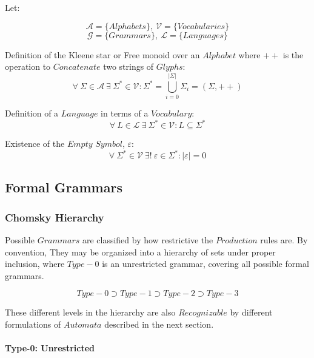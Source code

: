 \documentclass{article}
\begin{document}
Let:

\[
    \mathcal{A} = \{ Alphabets \},\: \mathcal{V} = \{ Vocabularies \}
\] \[
    \mathcal{G} = \{ Grammars \},\: \mathcal{L} = \{ Languages \}
\]

    \begin{description}

    \item Definition of the Kleene star or Free monoid over an
      $Alphabet$ where $++$ is the operation to $Concatenate$ two
      strings of $Glyphs$:
    \[
        \forall \: \Sigma \in \mathcal{A} \:
        \exists \: \Sigma^* \in \mathcal{V}
        : \Sigma^* = \bigcup_{i=0}^{|\Sigma|} \Sigma_i
        = (\Sigma,++)
    \]

    \item Definition of a $Language$ in terms of a $Vocabulary$:
    \[
        \forall \: L \in \mathcal{L} \:
        \exists \: \Sigma^* \in \mathcal{V}
        : L \subseteq \Sigma^*
    \]

    \item Existence of the $Empty$ $Symbol$, $\varepsilon$:
    \[
        \forall \: \Sigma^* \in \mathcal{V} \:
        \exists ! \: \varepsilon \in \Sigma^*
        : |\varepsilon|=0
    \]

    \end{description}

\subsection{Formal Grammars}

\subsubsection{Chomsky Hierarchy}

Possible $Grammars$ are classified by how restrictive the $Production$
rules are. By convention, They may be organized into a hierarchy of
sets under proper inclusion, where $Type-0$ is an unrestricted
grammar, covering all possible formal grammars.

\[
    Type-0 \supset Type-1 \supset Type-2 \supset Type-3
\]

 These different levels in the hierarchy are also $Recognizable$ by
 different formulations of $Automata$ described in the next section.

\paragraph{Type-0: Unrestricted}
\end{document}
